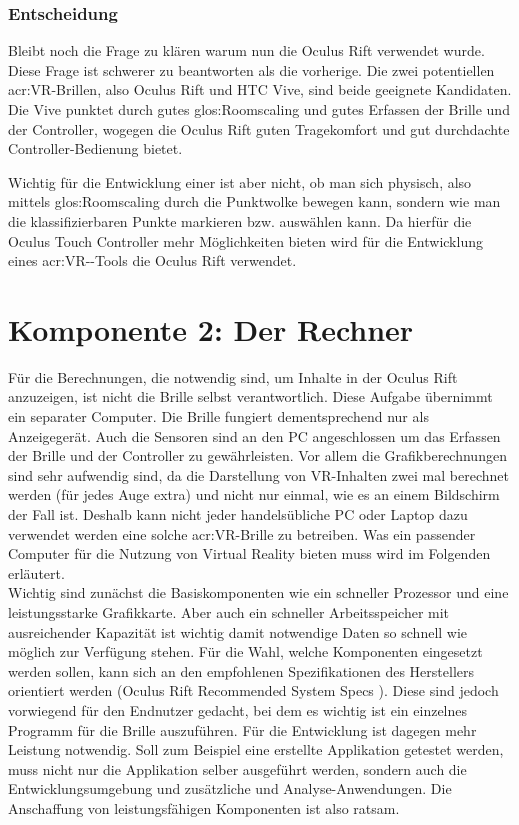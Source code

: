 \subsubsection{Entscheidung}
Bleibt noch die Frage zu klären warum nun die Oculus Rift verwendet wurde. Diese Frage ist schwerer zu beantworten als die vorherige. Die zwei potentiellen \acrshort{acr:VR}-Brillen, also Oculus Rift und HTC Vive, sind beide geeignete Kandidaten. Die Vive punktet durch gutes \gls{glos:Roomscaling} und gutes Erfassen der Brille und der Controller, wogegen die Oculus Rift guten Tragekomfort und gut durchdachte Controller-Bedienung bietet. 

Wichtig für die Entwicklung einer  ist aber nicht, ob man sich physisch, also mittels \gls{glos:Roomscaling} durch die Punktwolke bewegen kann, sondern wie man die klassifizierbaren Punkte markieren bzw. auswählen kann. Da hierfür die Oculus Touch Controller mehr Möglichkeiten bieten wird für die Entwicklung eines \acrshort{acr:VR}--Tools die Oculus Rift verwendet. 

\section{Komponente 2: Der Rechner}
\label{sec:VR-Rechner}
Für die Berechnungen, die notwendig sind, um Inhalte in der Oculus Rift anzuzeigen, ist nicht die Brille selbst verantwortlich. Diese Aufgabe übernimmt ein separater Computer. Die Brille fungiert dementsprechend nur als Anzeigegerät. Auch die Sensoren sind an den PC angeschlossen um das Erfassen der Brille und der Controller zu gewährleisten. Vor allem die Grafikberechnungen sind sehr aufwendig sind, da die Darstellung von VR-Inhalten zwei mal berechnet werden (für jedes Auge extra) und nicht nur einmal, wie es an einem Bildschirm der Fall ist. Deshalb kann nicht jeder handelsübliche PC oder Laptop dazu verwendet werden eine solche \acrshort{acr:VR}-Brille zu betreiben. Was ein passender Computer für die Nutzung von Virtual Reality bieten muss wird im Folgenden erläutert.\\ 

Wichtig sind zunächst die Basiskomponenten wie ein schneller Prozessor und eine leistungsstarke Grafikkarte. Aber auch ein schneller Arbeitsspeicher mit ausreichender Kapazität ist wichtig damit notwendige Daten so schnell wie möglich zur Verfügung stehen. Für die Wahl, welche Komponenten eingesetzt werden sollen, kann sich an den empfohlenen Spezifikationen des Herstellers orientiert werden (Oculus Rift Recommended System Specs \cite{bib:OculusSpecs}). Diese sind jedoch vorwiegend für den Endnutzer gedacht, bei dem es wichtig ist ein einzelnes Programm für die Brille auszuführen. Für die Entwicklung ist dagegen mehr Leistung notwendig. Soll zum Beispiel eine erstellte Applikation getestet werden, muss nicht nur die Applikation selber ausgeführt werden, sondern auch die Entwicklungsumgebung und zusätzliche  und  Analyse-Anwendungen. Die Anschaffung von leistungsfähigen Komponenten ist also ratsam.\\


